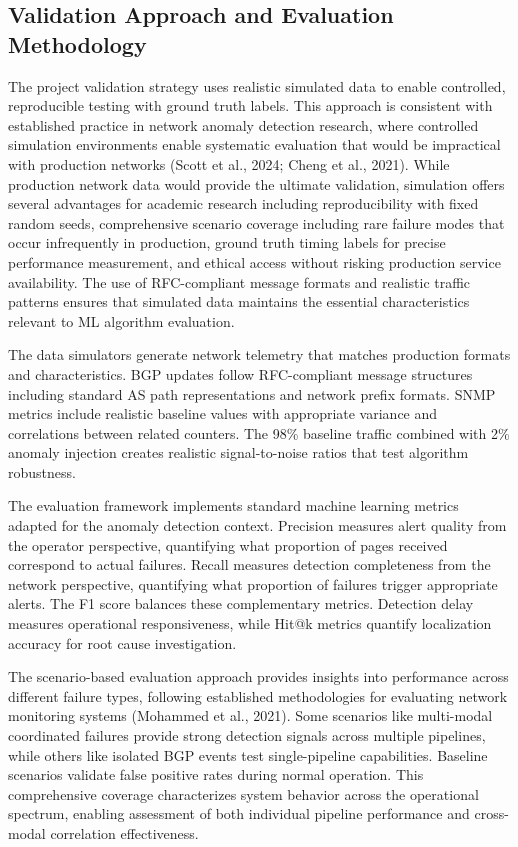 \documentclass[11pt]{article}
\begin{document}
\subsection{Validation Approach and Evaluation Methodology}

The project validation strategy uses realistic simulated data to enable controlled, reproducible testing with ground truth labels. This approach is consistent with established practice in network anomaly detection research, where controlled simulation environments enable systematic evaluation that would be impractical with production networks (Scott et al., 2024; Cheng et al., 2021). While production network data would provide the ultimate validation, simulation offers several advantages for academic research including reproducibility with fixed random seeds, comprehensive scenario coverage including rare failure modes that occur infrequently in production, ground truth timing labels for precise performance measurement, and ethical access without risking production service availability. The use of RFC-compliant message formats and realistic traffic patterns ensures that simulated data maintains the essential characteristics relevant to ML algorithm evaluation.

The data simulators generate network telemetry that matches production formats and characteristics. BGP updates follow RFC-compliant message structures including standard AS path representations and network prefix formats. SNMP metrics include realistic baseline values with appropriate variance and correlations between related counters. The 98\% baseline traffic combined with 2\% anomaly injection creates realistic signal-to-noise ratios that test algorithm robustness.

The evaluation framework implements standard machine learning metrics adapted for the anomaly detection context. Precision measures alert quality from the operator perspective, quantifying what proportion of pages received correspond to actual failures. Recall measures detection completeness from the network perspective, quantifying what proportion of failures trigger appropriate alerts. The F1 score balances these complementary metrics. Detection delay measures operational responsiveness, while Hit@k metrics quantify localization accuracy for root cause investigation.

The scenario-based evaluation approach provides insights into performance across different failure types, following established methodologies for evaluating network monitoring systems (Mohammed et al., 2021). Some scenarios like multi-modal coordinated failures provide strong detection signals across multiple pipelines, while others like isolated BGP events test single-pipeline capabilities. Baseline scenarios validate false positive rates during normal operation. This comprehensive coverage characterizes system behavior across the operational spectrum, enabling assessment of both individual pipeline performance and cross-modal correlation effectiveness.
\end{document}
